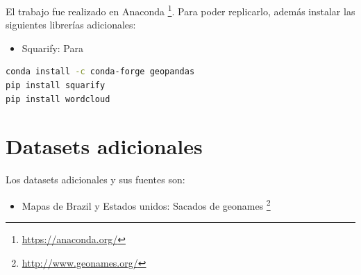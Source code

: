 \documentclass[a4paper]{article}
\begin{document}
El trabajo fue realizado en Anaconda \footnote{\url{https://anaconda.org/}}. Para poder replicarlo, además instalar las siguientes librerías adicionales:

\begin{itemize}
\item{Squarify: Para }
\end{itemize}

\begin{lstlisting}[language=sh]
conda install -c conda-forge geopandas
pip install squarify
pip install wordcloud
\end{lstlisting}

\section{Datasets adicionales}

Los datasets adicionales y sus fuentes son:

\begin{itemize}
\item{Mapas de Brazil y Estados unidos: Sacados de geonames \footnote{\url{http://www.geonames.org/}} }
\end{itemize}

\newpage
\end{document}
